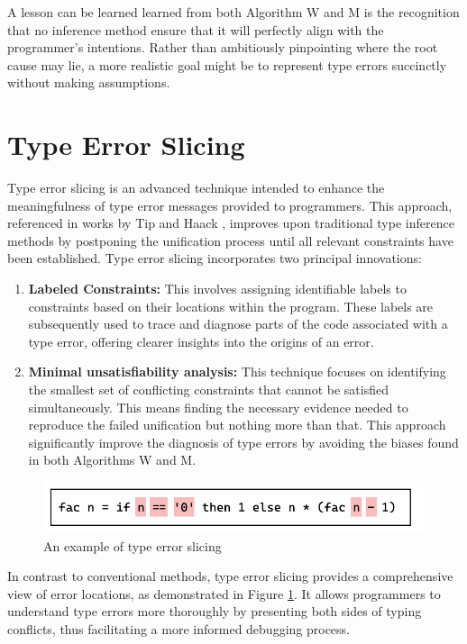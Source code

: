 A lesson can be learned learned from both Algorithm W and M is the recognition that no inference method ensure that it will perfectly align with the programmer’s intentions. Rather than ambitiously pinpointing where the root cause may lie, a more realistic goal might be to represent type errors succinctly without making assumptions.


\section{Type Error Slicing}

Type error slicing is an advanced technique intended to enhance the meaningfulness of type error messages provided to programmers. This approach, referenced in works by Tip \cite{Tip2001-qn} and Haack \cite{Haack2004-fr}, improves upon traditional type inference methods by postponing the unification process until all relevant constraints have been established. Type error slicing incorporates two principal innovations:


\begin{enumerate}
  \item {
    \textbf{Labeled Constraints:}
    This involves assigning identifiable labels to constraints based on their locations within the program. These labels are subsequently used to trace and diagnose parts of the code associated with a type error, offering clearer insights into the origins of an error.
  }
  \item {
    \textbf{Minimal unsatisfiability analysis:} 
    This technique focuses on identifying the smallest set of conflicting constraints that cannot be satisfied simultaneously. This means finding the necessary evidence needed to reproduce the failed unification but nothing more than that. This approach significantly improve the diagnosis of type errors by avoiding the biases found in both Algorithms W and M.
  }
\end{enumerate}


\begin{figure}[hbt]
  \includegraphics[width=0.5\linewidth]{TypeErrorSlicing.pdf}
  \caption{
    \label{fig:type-error-slicing}
      An example of type error slicing}
\end{figure}

In contrast to conventional methods, type error slicing provides a comprehensive view of error locations, as demonstrated in Figure \ref{fig:type-error-slicing}. It allows programmers to understand type errors more thoroughly by presenting both sides of typing conflicts, thus facilitating a more informed debugging process.

